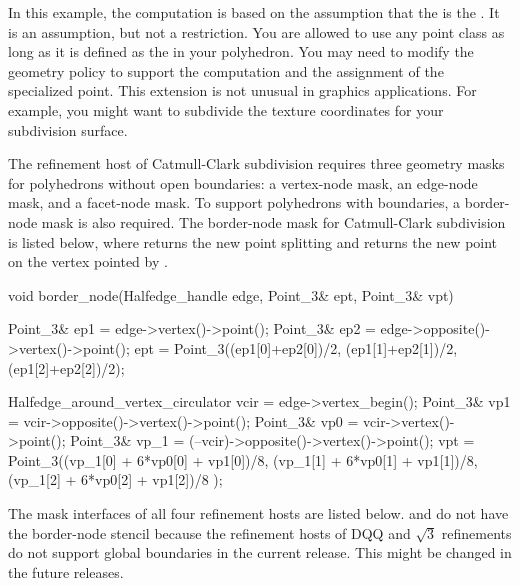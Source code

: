 In this example, the computation is based on the assumption that
the  is the . It is an assumption, 
but not a restriction.
You are allowed to use any point class as long as it is
defined as the  in your polyhedron.
You may need to modify the geometry policy to support the computation
and the assignment of the specialized point. This extension is not unusual 
in graphics applications. For example, you might want to subdivide the
texture coordinates for your subdivision surface. 

The refinement host of Catmull-Clark subdivision
requires three geometry masks for 
polyhedrons without open boundaries: a vertex-node 
mask, an edge-node mask, and a facet-node mask. 
To support polyhedrons with boundaries, a border-node mask is 
also required. The border-node mask for Catmull-Clark subdivision
is listed below, where  returns the new point splitting 
 and  returns the new point on the vertex pointed by
.  


\begin{ccExampleCode}
  void border_node(Halfedge_handle edge, Point_3& ept, Point_3& vpt) {
    Point_3& ep1 = edge->vertex()->point();
    Point_3& ep2 = edge->opposite()->vertex()->point();
    ept = Point_3((ep1[0]+ep2[0])/2, (ep1[1]+ep2[1])/2, (ep1[2]+ep2[2])/2);

    Halfedge_around_vertex_circulator vcir = edge->vertex_begin();
    Point_3& vp1  = vcir->opposite()->vertex()->point();
    Point_3& vp0  = vcir->vertex()->point();
    Point_3& vp_1 = (--vcir)->opposite()->vertex()->point();
    vpt = Point_3((vp_1[0] + 6*vp0[0] + vp1[0])/8,
                  (vp_1[1] + 6*vp0[1] + vp1[1])/8,
                  (vp_1[2] + 6*vp0[2] + vp1[2])/8 );
  }
\end{ccExampleCode}


The mask interfaces of all four refinement hosts are listed below.
 and  
do not have the border-node stencil because the refinement hosts of
DQQ and $\sqrt{3}$ refinements do not support global boundaries in the 
current release. This might be changed in the future releases.

